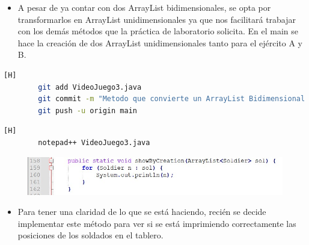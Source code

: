 \documentclass{article}
\begin{document}
	\begin{itemize}	
		\item A pesar de ya contar con dos ArrayList bidimensionales, se opta por transformarlos en ArrayList unidimensionales ya que nos facilitará trabajar con los demás métodos que la práctica de laboratorio solicita. En el main se hace la creación de dos ArrayList unidimensionales tanto para el ejército A y B.
	\end{itemize}
	
	
	\begin{lstlisting}[language=bash,caption={Commit: Metodo que convierte un ArrayList Bidimensional a Unidimensional}][H]
		git add VideoJuego3.java
		git commit -m "Metodo que convierte un ArrayList Bidimensional a Unidimensional"			
		git push -u origin main
	\end{lstlisting}
	
	
	
	
	
	
	\begin{lstlisting}[language=bash,caption={Se implementa el método que muestra los datos del ArrayList unidimensional según su orden de creación}][H]
		notepad++ VideoJuego3.java
	\end{lstlisting}
	
	\begin{figure}[H]
		\centering
		\includegraphics[width=1\textwidth,keepaspectratio]{img/4.jpg}
	\end{figure}
	
	\begin{itemize}	
		\item Para tener una claridad de lo que se está haciendo, recién se decide implementar este método para ver si se está imprimiendo correctamente las posiciones de los soldados en el tablero.
	\end{itemize}
	
\end{document}
